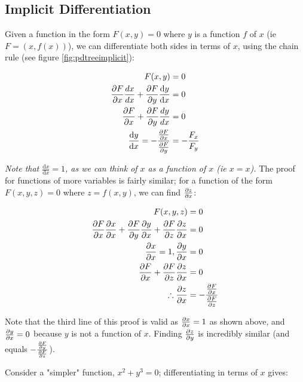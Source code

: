 \documentclass[12pt]{article}
\begin{document}

\subsection{Implicit Differentiation}

Given a function in the form $F(x,y) = 0$ where $y$ is a function $f$ of $x$ (ie $F = (x,f(x))$), we can differentiate both sides in terms of $x$, using the chain rule (see figure \ref{fig:pdtreeimplicit}):


\begin{equation}
    \begin{split}
        F(x,y) &= 0\\       
        \frac{\partial F}{\partial x} \frac{dx}{dx} +\frac{\partial F}{\partial y}\frac{\text{d}y}{\text{d}x} &= 0\\
        \frac{\partial F}{\partial x} + \frac{\partial F}{\partial y}\frac{dy}{dx} &= 0\\
        \frac{\text{d}y}{\text{d}x} = -\frac{\frac{\partial F}{\partial x}}{\frac{\partial F}{\partial y}} &= -\frac{F_x}{F_y}
    \end{split}
\end{equation}

\textit{Note that $\frac{\text{d}x}{\text{d}x} = 1$, as we can think of $x$ as a function of $x$ (ie $x = x$).} The proof for functions of more variables is fairly similar; for a function of the form $F(x,y,z)=0$ where $z = f(x,y)$, we can find $\frac{\partial z}{\partial x}$:

\begin{equation}
    \begin{split}
        F(x,y,z) &= 0\\
        \frac{\partial F}{\partial x}\frac{\partial x}{\partial x} + \frac{\partial F}{\partial y}\frac{\partial y}{\partial x} + \frac{\partial F}{\partial z}\frac{\partial z}{\partial x} &= 0\\
        \frac{\partial x}{\partial x} = 1, \frac{\partial y}{\partial x} &= 0\\
        \frac{\partial F}{\partial x} + \frac{\partial F}{\partial z}\frac{\partial z}{\partial x} &= 0\\
        \therefore \frac{\partial z}{\partial x} &= -\frac{\frac{\partial F}{\partial x}}{\frac{\partial F}{\partial z}}\\
    \end{split}
\end{equation}

Note that the third line of this proof is valid as $\frac{\partial x}{\partial x} = 1$ as shown above, and $\frac{\partial y}{\partial x} = 0$ because $y$ is not a function of $x$. Finding $\frac{\partial z}{\partial y}$ is incredibly similar (and equals $-\frac{\frac{\partial F}{\partial y}}{\frac{\partial F}{\partial z}}$).

Consider a "simpler" function, $x^2+y^3=0$; differentiating in terms of $x$ gives:
\end{document}
